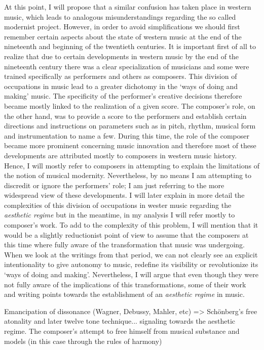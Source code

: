 At this point, I will propose that a similar confusion has taken place in western music, which  leads to analogous misunderstandings regarding the so called modernist project. However, in order to avoid simplifications we should first remember certain aspects about the state of western music at the end of the nineteenth and beginning of the twentieth centuries. It is important first of all to realize that due to certain developments in western music by the end of the nineteenth century there was a clear specialization of musicians and some were trained specifically as performers and others as composers. This division of occupations in music lead to a greater dichotomy in the `ways of doing and making' music. The specificity of the performer's creative decisions therefore became mostly linked to the realization of a given score. The composer's role, on the other hand, was to provide a score to the performers and establish certain directions and instructions on parameters such as in pitch, rhythm, musical form and instrumentation to name a few. During this time, the role of the composer became more prominent concerning music innovation and therefore most of these developments are attributed mostly to composers in western music history. Hence, I will mostly refer to composers in attempting to explain the limitations of the notion of musical modernity. Nevertheless, by no means I am attempting to discredit or ignore the performers' role; I am just referring to the more widespread view of these developments. I will later explain in more detail the complexities of this division of occupations in wester music regarding the \emph{aesthetic regime} but in the meantime, in my analysis I will refer mostly to composer's work. To add to the complexity of this problem, I will mention that it would be a slightly reductionist point of view to assume that the composers at this time where fully aware of the transformation that music was undergoing. When we look at the writings from that period, we can not clearly see an explicit intentionality to give autonomy to music, redefine its visibility or revolutionize its `ways of doing and making'. Nevertheless, I will argue that even though they were not fully aware of the implications of this transformations, some of their work and writing points towards the establishment of an \emph{aesthetic regime} in music.

Emancipation of dissonance (Wagner, Debussy, Mahler, etc) => Sch\"{o}nberg's free atonality and later twelve tone technique... signaling towards the aesthetic regime. The composer's attempt to free himself from musical substance and models (in this case through the rules of harmony) 

